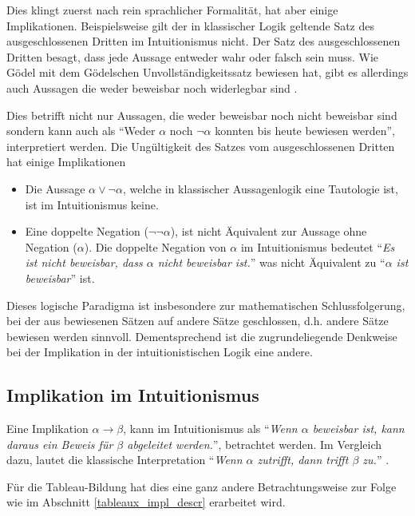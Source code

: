 Dies klingt zuerst nach rein sprachlicher Formalität, hat aber einige Implikationen. Beispielsweise gilt der in klassischer Logik geltende Satz des ausgeschlossenen Dritten im Intuitionismus nicht. Der Satz des ausgeschlossenen Dritten besagt, dass jede Aussage entweder wahr oder falsch sein muss. Wie Gödel mit dem Gödelschen Unvollständigkeitssatz bewiesen hat, gibt es allerdings auch Aussagen die weder beweisbar noch widerlegbar sind \cite{B62}.

Dies betrifft nicht nur Aussagen, die weder beweisbar noch nicht beweisbar sind sondern kann auch als ``Weder $\alpha$ noch $\neg\alpha$ konnten bis heute bewiesen werden'', interpretiert werden. Die Ungültigkeit des Satzes vom ausgeschlossenen Dritten hat einige Implikationen \cite{B62}
\begin{itemize}
\item Die Aussage $\alpha\vee\neg\alpha$, welche in klassischer Aussagenlogik eine Tautologie ist, ist im Intuitionismus keine.

\item Eine doppelte Negation ($\neg\neg\alpha$), ist nicht Äquivalent zur Aussage ohne Negation ($\alpha$). Die doppelte Negation von $\alpha$ im Intuitionismus bedeutet ``\textit{Es ist nicht beweisbar, dass $\alpha$ nicht beweisbar ist.}'' was nicht Äquivalent zu ``\textit{$\alpha$ ist beweisbar}'' ist.
\end{itemize}

Dieses logische Paradigma ist insbesondere zur mathematischen Schlussfolgerung, bei der aus bewiesenen Sätzen auf andere Sätze geschlossen, d.h. andere Sätze bewiesen werden sinnvoll. Dementsprechend ist die zugrundeliegende Denkweise bei der Implikation in der intuitionistischen Logik eine andere.

\subsection{\label{impl_in_intu}Implikation im Intuitionismus}
Eine Implikation $\alpha\rightarrow\beta$, kann im Intuitionismus als ``\textit{Wenn $\alpha$ beweisbar ist, kann daraus ein Beweis für $\beta$ abgeleitet werden.}'', betrachtet werden. Im Vergleich dazu, lautet die klassische Interpretation ``\textit{Wenn $\alpha$ zutrifft, dann trifft $\beta$ zu.}'' \cite{B62}.

Für die Tableau-Bildung hat dies eine ganz andere Betrachtungsweise zur Folge wie im Abschnitt \ref{tableaux_impl_descr} erarbeitet wird.

